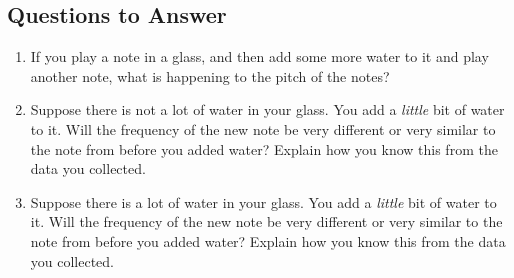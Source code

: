 \documentclass[12pt,noauthor,nooutcomes,hints,instructornotes]{ximera}%
\begin{document}
\subsection{Questions to Answer}
\begin{enumerate}

    \item If you play a note in a glass, and then add some more water to it and play another note, what is happening to the pitch of the notes?
    
    \item Suppose there is not a lot of water in your glass.  You add a \textit{little} bit of water to it.  Will the frequency of the new note be very different or very similar to the note from before you added water?  Explain how you know this from the data you collected.
    
    \item Suppose there is a lot of water in your glass.  You add a \textit{little} bit of water to it.  Will the frequency of the new note be very different or very similar to the note from before you added water?  Explain how you know this from the data you collected.
    
\end{enumerate}
\end{document}
